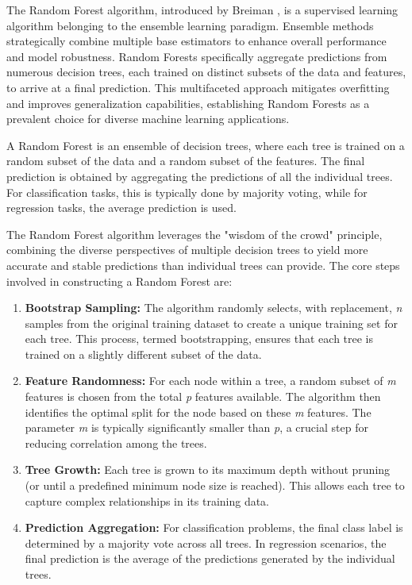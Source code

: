 The Random Forest algorithm, introduced by Breiman \cite{breiman2001random}, is a supervised learning algorithm belonging to the ensemble learning paradigm.
Ensemble methods strategically combine multiple base estimators to enhance overall performance and model robustness.
Random Forests specifically aggregate predictions from numerous decision trees, each trained on distinct subsets of the data and features, to arrive at a final prediction.
This multifaceted approach mitigates overfitting and improves generalization capabilities, establishing Random Forests as a prevalent choice for diverse machine learning applications.

A Random Forest is an ensemble of decision trees, where each tree is trained on a random subset of the data and a random subset of the features.
The final prediction is obtained by aggregating the predictions of all the individual trees.
For classification tasks, this is typically done by majority voting, while for regression tasks, the average prediction is used.

The Random Forest algorithm leverages the "wisdom of the crowd" principle, combining the diverse perspectives of multiple decision trees to yield more accurate and stable predictions than individual trees can provide.
The core steps involved in constructing a Random Forest are:

\begin{enumerate}
    \item \textbf{Bootstrap Sampling:} The algorithm randomly selects, with replacement, \textit{n} samples from the original training dataset to create a unique training set for each tree.
This process, termed bootstrapping, ensures that each tree is trained on a slightly different subset of the data.
    \item \textbf{Feature Randomness:} For each node within a tree, a random subset of \textit{m} features is chosen from the total \textit{p} features available.
The algorithm then identifies the optimal split for the node based on these \textit{m} features.
The parameter \textit{m} is typically significantly smaller than \textit{p}, a crucial step for reducing correlation among the trees.
    \item \textbf{Tree Growth:} Each tree is grown to its maximum depth without pruning (or until a predefined minimum node size is reached).
This allows each tree to capture complex relationships in its training data.
    \item \textbf{Prediction Aggregation:} For classification problems, the final class label is determined by a majority vote across all trees.
In regression scenarios, the final prediction is the average of the predictions generated by the individual trees.
\end{enumerate}

